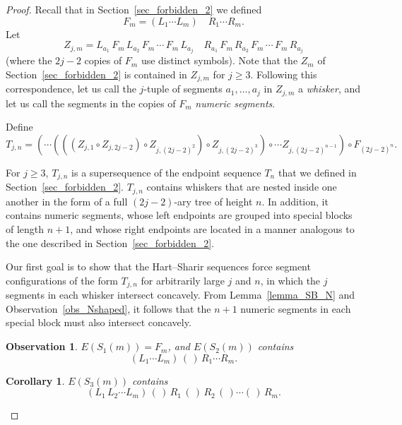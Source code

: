 \documentclass[11pt]{article}
\newtheorem{observation}[theorem]{Observation}
\newtheorem{corollary}[theorem]{Corollary}
\theoremstyle{definition}
\theoremstyle{remark}
\begin{document}
\begin{proof}

Recall that in Section~\ref{sec_forbidden_2} we defined
\begin{equation*}
F_m = (L_1\cdots L_m)\quad R_1\cdots R_m.
\end{equation*}
Let
\begin{equation*}
Z_{j,m} = L_{a_1}\, F_m\, L_{a_2}\, F_m\, \cdots \, F_m\, L_{a_j}\quad R_{a_1}\, F_m\, R_{a_2}\, F_m\, \cdots\, F_m\, R_{a_j}
\end{equation*}
(where the $2j-2$ copies of $F_m$ use distinct symbols). Note that the $Z_m$ of Section~\ref{sec_forbidden_2} is contained in $Z_{j,m}$ for $j\ge 3$. Following this correspondence, let us call the $j$-tuple of segments $a_1, \ldots, a_j$ in $Z_{j,m}$ a \emph{whisker}, and let us call the segments in the copies of $F_m$ \emph{numeric segments}.

Define
\begin{equation*}
T_{j,n} = ( \cdots (((Z_{j,1} \circ Z_{j,2j-2}) \circ Z_{j,(2j-2)^2}) \circ Z_{j,(2j-2)^3}) \circ \cdots Z_{j,(2j-2)^{n-1}}) \circ F_{(2j-2)^n}.
\end{equation*}

For $j\ge 3$, $T_{j,n}$ is a supersequence of the endpoint sequence $T_n$ that we defined in Section~\ref{sec_forbidden_2}. $T_{j,n}$ contains whiskers that are nested inside one another in the form of a full $(2j-2)$-ary tree of height $n$. In addition, it contains numeric segments, whose left endpoints are grouped into special blocks of length $n+1$, and whose right endpoints are located in a manner analogous to the one described in Section~\ref{sec_forbidden_2}.

Our first goal is to show that the Hart--Sharir sequences force segment configurations of the form $T_{j,n}$ for arbitrarily large $j$ and $n$, in which the $j$ segments in each whisker intersect concavely. From Lemma~\ref{lemma_SB_N} and Observation~\ref{obs_Nshaped}, it follows that the $n+1$ numeric segments in each special block must also intersect concavely.

\begin{observation}\label{obs_S1}
$E(S_1(m)) = F_m$, and $E(S_2(m))$ contains
\begin{equation}\label{eq_obs_S1}
(L_1 \cdots L_m)\,(\,)\,R_1\cdots R_m.
\end{equation}
\end{observation}

\begin{corollary}\label{cor_S3}
$E(S_3(m))$ contains
\begin{equation}\label{eq_cor_S3}
(L_1\,L_2 \cdots L_m)\,(\,)\,R_1\,(\,)\,R_2\,(\,)\cdots(\,)\,R_m.
\end{equation}
\end{corollary}


\end{proof}
\end{document}
